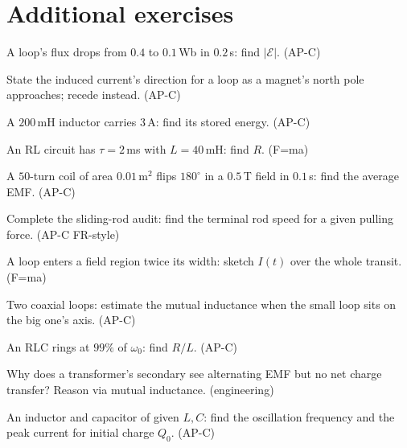 \section*{Additional exercises}

\begin{exercise}[easy]
A loop's flux drops from $0.4$ to $0.1$\,Wb in $0.2$\,s: find
$|\mathcal E|$. (AP-C)
\end{exercise}
\begin{exercise}[easy]
State the induced current's direction for a loop as a magnet's north
pole approaches; recede instead. (AP-C)
\end{exercise}
\begin{exercise}[easy]
A $200$\,mH inductor carries $3$\,A: find its stored energy. (AP-C)
\end{exercise}
\begin{exercise}[easy]
An RL circuit has $\tau=2$\,ms with $L=40$\,mH: find $R$. (F=ma)
\end{exercise}
\begin{exercise}[easy]
A $50$-turn coil of area $0.01$\,m$^{2}$ flips $180^{\circ}$ in a
$0.5$\,T field in $0.1$\,s: find the average EMF. (AP-C)
\end{exercise}
\begin{exercise}[medium]
Complete the sliding-rod audit: find the terminal rod speed for a given
pulling force. (AP-C FR-style)
\end{exercise}
\begin{exercise}[medium]
A loop enters a field region twice its width: sketch $I(t)$ over the
whole transit. (F=ma)
\end{exercise}
\begin{exercise}[medium]
Two coaxial loops: estimate the mutual inductance when the small loop
sits on the big one's axis. (AP-C)
\end{exercise}
\begin{exercise}[medium]
An RLC rings at $99\%$ of $\omega_0$: find $R/L$. (AP-C)
\end{exercise}
\begin{exercise}[medium]
Why does a transformer's secondary see alternating EMF but no net
charge transfer? Reason via mutual inductance. (engineering)
\end{exercise}
\begin{exercise}[medium]
An inductor and capacitor of given $L,C$: find the oscillation
frequency and the peak current for initial charge $Q_0$. (AP-C)
\end{exercise}
